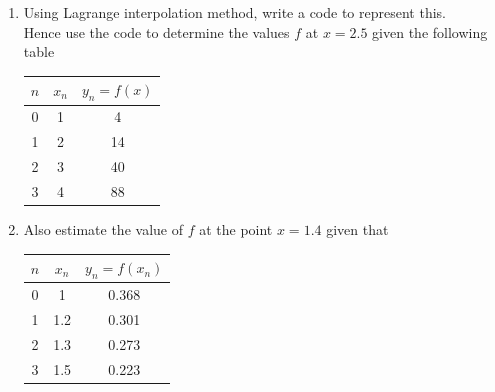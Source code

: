 \documentclass[a4paper,12pt,openany]{book}
\begin{document}
\begin{problem}
	\begin{enumerate}
		\item Using Lagrange interpolation method, write a code to represent this.\\
		Hence use the code to determine the values $f$ at $x = 2.5$ given the following table
		
		\begin{tabular}{|c|c|c|}
			\hline 
			$n$ & $x_n$ & $y_n = f(x)$ \\
			\hline
			0 & 1 & 4 \\
			1 & 2 & 14 \\
			2 & 3 & 40 \\
			3 & 4 & 88\\
			\hline
		\end{tabular}
		\item Also estimate the value of $f$ at the point $x = 1.4$ given that\\ 
		\begin{tabular}{|c|c|c|}
			\hline 
			$n$ & $x_n$ & $y_n = f(x_n)$ \\
			\hline
			0 & 1 & 0.368 \\
			1 & 1.2 & 0.301\\
			2 & 1.3 & 0.273 \\
			3 & 1.5 & 0.223 \\
			\hline
		\end{tabular}
	\end{enumerate}
\end{problem}
\end{document}
